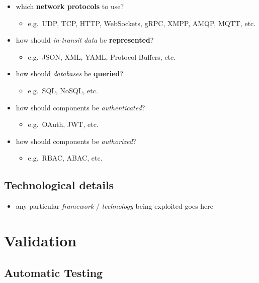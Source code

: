 \documentclass{scrartcl}
\begin{document}
\begin{itemize}
	\item which \textbf{network protocols} to use?
	\begin{itemize}
		\item e.g.~UDP, TCP, HTTP, WebSockets, gRPC, XMPP, AMQP, MQTT, etc.
	\end{itemize}
	
	\item how should \emph{in-transit data} be \textbf{represented}?
	\begin{itemize}
		\item e.g.~JSON, XML, YAML, Protocol Buffers, etc.
	\end{itemize}
	
	\item how should \emph{databases} be \textbf{queried}?
	\begin{itemize}
		\item e.g.~SQL, NoSQL, etc.
	\end{itemize}
	
	\item how should components be \emph{authenticated}?
	\begin{itemize}
		\item e.g.~OAuth, JWT, etc.
	\end{itemize}
	
	\item how should components be \emph{authorized}?
	\begin{itemize}
		\item e.g.~RBAC, ABAC, etc.
	\end{itemize}
\end{itemize}

\subsection{Technological details}\label{technological-details}

\begin{itemize}
	\item any particular \emph{framework} / \emph{technology} being exploited goes here
\end{itemize}

\section{Validation}\label{validation}

\subsection{Automatic Testing}\label{automatic-testing}
\end{document}
